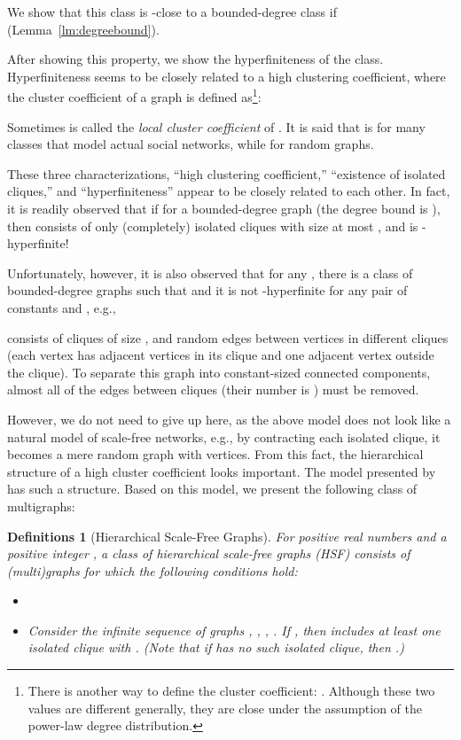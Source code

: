 \documentclass[11pt]{article}
\newtheorem{df}[thm]{Definitions}
\begin{document}
We show that this class is -close to a bounded-degree class if  (Lemma~\ref{lm:degreebound}). 

After showing this property, we show the hyperfiniteness of the class. 
Hyperfiniteness seems to be closely related to a high clustering coefficient, where 
the cluster coefficient  of a graph  
is defined as\footnote{
There is another way to define the cluster coefficient: 
. 
Although these two values are different generally, they are close under the assumption of the power-law degree distribution.  
}:


Sometimes  is called the {\em local cluster coefficient} of . 
It is said that  is  for 
many classes that model actual social networks, while 
 for random graphs. 

These three characterizations, 
``high clustering coefficient,'' 
``existence of isolated cliques,'' 
and 
``hyperfiniteness''  
appear to be closely related to each other.  
In fact, it is readily observed that 
if  for a bounded-degree graph  (the degree bound is ), 
then  consists of only (completely) isolated cliques with size at most , and 
 is -hyperfinite! 

Unfortunately, however, 
it is also observed that 
for any , 
there is a class of bounded-degree graphs  
such that  and 
it is not -hyperfinite 
for any pair of constants  and , e.g., 
 
consists of 
 cliques of size , 
and random  edges between 
vertices in different cliques (each vertex has  adjacent vertices in its clique and one adjacent vertex outside the clique).  
To separate this graph into constant-sized connected components, almost all of the edges between cliques (their number is ) must be removed. 

However, we do not need to give up here, as the above model does not look like a natural model of 
scale-free networks, e.g., by contracting each isolated clique, it becomes a mere random graph with  vertices.  
From this fact, the hierarchical structure of a high cluster coefficient looks important. 
The model presented by \cite{Uno-Watanabe_ScaleFree} has such a structure.  
Based on this model, we present the following class of multigraphs: 







\begin{df}[Hierarchical Scale-Free Graphs]\label{df:HSF}
For positive real numbers  and a positive integer , 
a class of {\em hierarchical scale-free graphs (HSF)} 
consists of (multi)graphs  
for which the following conditions hold: 
\begin{itemize}
\item[(i)] 
\item[(ii)] Consider the infinite sequence of graphs 
, , , .   
If , then  includes at least one isolated clique 
 with . 
(Note that if  has no such isolated clique, then .)
\end{itemize}
\end{df}
\end{document}
